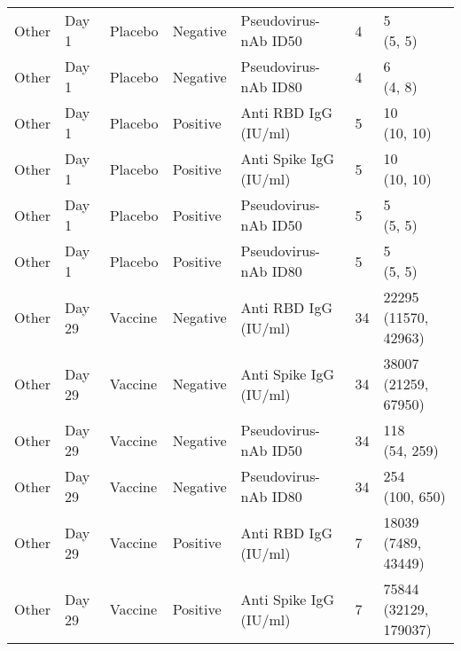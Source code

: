 \documentclass[]{book}
\theoremstyle{definition}
\theoremstyle{definition}
\theoremstyle{definition}
\newcommand{\1}{\mathbbm{1}}
\begin{document}
\begin{landscape}
\begin{ThreePartTable}
\begin{longtable}[t]{>{\raggedright\arraybackslash}p{7cm}llllll}
\hspace{1em}Other & Day 1 & Placebo & Negative & Pseudovirus-nAb ID50 & 4 & \makecell[l]{5\\(5, 5)}\\
\hspace{1em}Other & Day 1 & Placebo & Negative & Pseudovirus-nAb ID80 & 4 & \makecell[l]{6\\(4, 8)}\\
\hspace{1em}Other & Day 1 & Placebo & Positive & Anti RBD IgG (IU/ml) & 5 & \makecell[l]{10\\(10, 10)}\\
\hspace{1em}Other & Day 1 & Placebo & Positive & Anti Spike IgG (IU/ml) & 5 & \makecell[l]{10\\(10, 10)}\\
\hspace{1em}Other & Day 1 & Placebo & Positive & Pseudovirus-nAb ID50 & 5 & \makecell[l]{5\\(5, 5)}\\
\hspace{1em}Other & Day 1 & Placebo & Positive & Pseudovirus-nAb ID80 & 5 & \makecell[l]{5\\(5, 5)}\\
\hspace{1em}Other & Day 29 & Vaccine & Negative & Anti RBD IgG (IU/ml) & 34 & \makecell[l]{22295\\(11570, 42963)}\\
\hspace{1em}Other & Day 29 & Vaccine & Negative & Anti Spike IgG (IU/ml) & 34 & \makecell[l]{38007\\(21259, 67950)}\\
\hspace{1em}Other & Day 29 & Vaccine & Negative & Pseudovirus-nAb ID50 & 34 & \makecell[l]{118\\(54, 259)}\\
\hspace{1em}Other & Day 29 & Vaccine & Negative & Pseudovirus-nAb ID80 & 34 & \makecell[l]{254\\(100, 650)}\\
\hspace{1em}Other & Day 29 & Vaccine & Positive & Anti RBD IgG (IU/ml) & 7 & \makecell[l]{18039\\(7489, 43449)}\\
\hspace{1em}Other & Day 29 & Vaccine & Positive & Anti Spike IgG (IU/ml) & 7 & \makecell[l]{75844\\(32129, 179037)}\\

\end{longtable}
\end{ThreePartTable}
\end{landscape}
\end{document}
